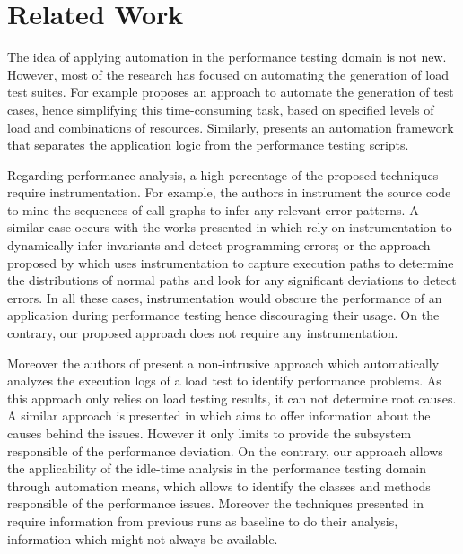 \documentclass[runningheads,a4paper]{llncs}
\begin{document}
\section{Related Work}
\label{RelatedWork}
\vspace{-7pt}

The idea of applying automation in the performance testing domain is not new.
However, most of the research has focused on automating the generation of load
test
suites\cite{Elvira1,Bayan1,Zhang1,Briand1,Avritzer2,Avritzer3,Chen1,Garousi1}.
For example \cite{Bayan1} proposes an approach to automate the generation of test 
cases, hence simplifying this time-consuming task, based on specified levels of
load and combinations of resources. Similarly, \cite{Chen1} presents an
automation framework that separates the application logic from the performance
testing scripts.

Regarding performance analysis, a high percentage of the proposed
techniques require instrumentation. For example, the authors in \cite{Yang1}
instrument the source code to mine the sequences of call graphs to infer any
relevant error patterns. A similar case occurs with the works presented in
\cite{Hangal1,Csallner1} which rely on instrumentation to dynamically infer
invariants and detect programming errors; or the approach proposed by
\cite{Chen2} which uses instrumentation to capture execution paths to determine
the distributions of normal paths and look for any significant deviations to
detect errors. In all these cases, instrumentation would obscure the performance
of an application during performance testing hence discouraging their usage.
On the contrary, our proposed approach does not require any instrumentation.

Moreover the authors of \cite{Jiang2009} present a non-intrusive approach which
automatically analyzes the execution logs of a load test to identify performance
problems. As this approach only relies on load testing results, it can not
determine root causes. A similar approach is presented in \cite{Malik1} which
aims to offer information about the causes behind the issues. However it only
limits to provide the subsystem responsible of the performance deviation. On the
contrary, our approach allows the applicability of the idle-time analysis in the
performance testing domain through automation means, which allows to identify the 
classes and methods responsible of the performance issues. Moreover the techniques presented
in \cite{Jiang2009,Malik1} require information from previous runs as
baseline to do their analysis, information which might not always be available.
\end{document}
